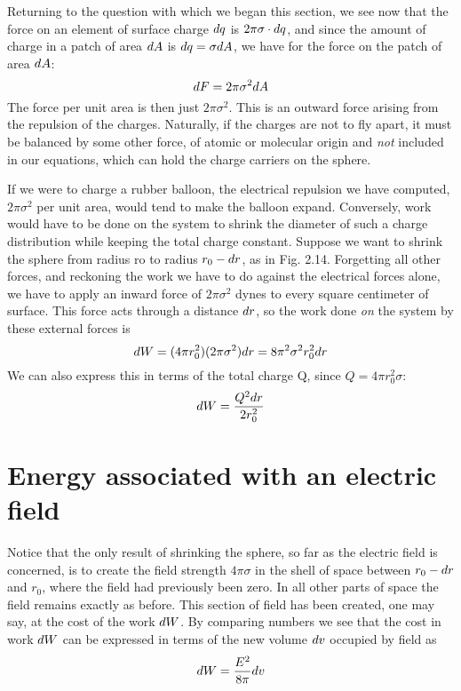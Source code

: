 Returning to the question with which we began this section, we see
now that the force on an element of surface charge $d q$ is $2\pi\sigma\cdot d q$, and
since the amount of charge in a patch of area $d A$ is $d q = \sigma d A$, we
have for the force on the patch of area $d A$:
\begin{equation}
  d F = 2\pi\sigma^2d A
\end{equation}
The force per unit area is then just $2\pi\sigma^2$. This is an outward force
arising from the repulsion of the charges. Naturally, if the charges
are not to fly apart, it must be balanced by some other force, of atomic
or molecular origin and \emph{not} included in our equations, which can hold
the charge carriers on the sphere.

If we were to charge a rubber balloon, the electrical repulsion we
have computed, $2\pi\sigma^2$ per unit area, would tend to make the balloon
expand. Conversely, work would have to be done on the system to
shrink the diameter of such a charge distribution while keeping the
total charge constant. Suppose we want to shrink the sphere from
radius ro to radius $r_0 - d r$, as in Fig. 2.14. Forgetting all other
forces, and reckoning the work we have to do against the electrical
forces alone, we have to apply an inward force of $2\pi\sigma^2$ dynes to every
square centimeter of surface. This force acts through a distance $d r$,
so the work done \emph{on} the system by these external forces is
\begin{equation}
  d W = (4\pi r_0^2)(2\pi\sigma^2)d r = 8\pi^2\sigma^2r_0^2d r
\end{equation}
We can also express this in terms of the total charge Q, since
$Q=4\pi r_0^2\sigma$:
\begin{equation}
  d W = \frac{Q^2d r}{2 r_0^2}
\end{equation}


\section{Energy associated with an electric field}

Notice that the only result of shrinking the sphere, so far as the
electric field is concerned, is to create the field strength $4\pi\sigma$ in the
shell of space between $r_0-d r$ and $r_0$, where the field had previously
been zero. In all other parts of space the field remains exactly as
before. This section of field has been created, one may say, at the
cost of the work $d W$. By comparing numbers we see that the cost
in work $d W$ can be expressed in terms of the new volume $d v$ occupied
by field as
\begin{equation}
  d W = \frac{E^2}{8\pi}d v
\end{equation}

